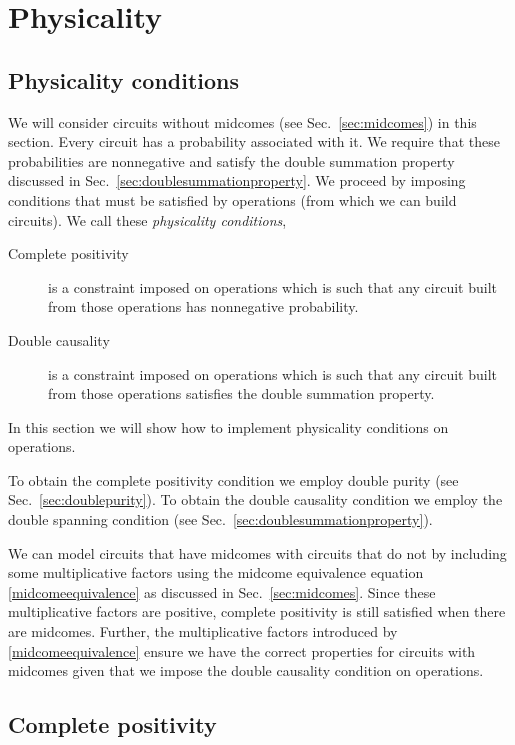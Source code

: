 \documentclass[10pt]{article}
\begin{document}
\section{Physicality}

\subsection{Physicality conditions}\label{sec:physicalityconstraints}

We will consider circuits without midcomes (see Sec.\ \ref{sec:midcomes}) in this section.  Every circuit has a probability associated with it. We require that these probabilities are nonnegative and satisfy the double summation property discussed in Sec.\ \ref{sec:doublesummationproperty}.   We proceed by imposing conditions that must be satisfied by operations (from which we can build circuits).  We call these \emph{physicality conditions},
\begin{description}
\item[Complete positivity] is a constraint imposed on operations which is such that any circuit built from those operations has nonnegative probability.
\item[Double causality] is a constraint imposed on operations which is such that any circuit built from those operations satisfies the double summation property.
\end{description}
In this section we will show how to implement physicality conditions on operations.

To obtain the complete positivity condition we employ double purity (see Sec.\ \ref{sec:doublepurity}).  To obtain the double causality condition we employ the double spanning condition (see Sec.\ \ref{sec:doublesummationproperty}).

We can model circuits that have midcomes with circuits that do not by including some multiplicative factors using the midcome equivalence equation \eqref{midcomeequivalence} as discussed in Sec.\ \ref{sec:midcomes}.  Since these multiplicative factors are positive, complete positivity is still satisfied when there are midcomes.  Further, the multiplicative factors introduced by \eqref{midcomeequivalence} ensure we have the correct properties for circuits with midcomes given that we impose the double causality condition on operations.




\subsection{Complete positivity}\label{sec:completepositivity}
\end{document}
